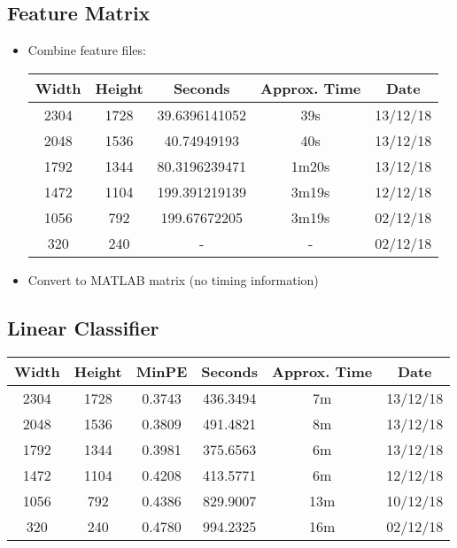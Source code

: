 \subsection{Feature Matrix}
\begin{itemize}
  \item Combine feature files:
  \begin{center}
  \begin{tabular}{ c c | c c c }
  Width & Height & Seconds & Approx. Time & Date \\ \hline
  2304 & 1728 & 39.6396141052 & 39s & 13/12/18 \\
  2048 & 1536 & 40.74949193 & 40s & 13/12/18 \\
  1792 & 1344 & 80.3196239471 & 1m20s & 13/12/18 \\
  1472 & 1104 & 199.391219139 & 3m19s & 12/12/18 \\
  1056 & 792 & 199.67672205 & 3m19s & 02/12/18 \\
  320 & 240 & - & - & 02/12/18 \\
  \end{tabular}
  \end{center}

  \item Convert to MATLAB matrix (no timing information)
\end{itemize}

\subsection{Linear Classifier}
  \begin{center}
  \begin{tabular}{ c c | c | c c c }
  Width & Height & MinPE & Seconds & Approx. Time & Date \\ \hline
  2304 & 1728 & 0.3743 & 436.3494 & 7m & 13/12/18 \\
  2048 & 1536 & 0.3809 & 491.4821 & 8m & 13/12/18 \\
  1792 & 1344 & 0.3981 & 375.6563 & 6m & 13/12/18 \\
  1472 & 1104 & 0.4208 & 413.5771 & 6m & 12/12/18 \\
  1056 & 792 & 0.4386 & 829.9007 & 13m & 10/12/18 \\
  320 & 240 & 0.4780 & 994.2325 & 16m & 02/12/18 \\
  \end{tabular}
  \end{center}